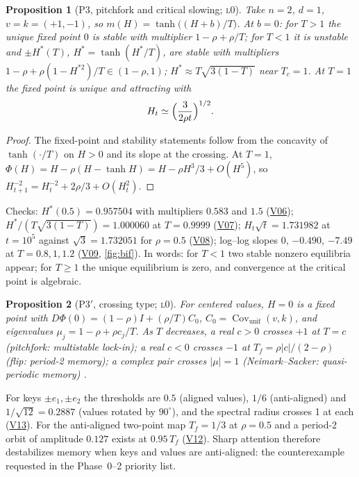 \documentclass[11pt]{article}
\newtheorem{proposition}{Proposition}
\theoremstyle{definition}
\theoremstyle{remark}
\newcommand{\Cov}{\operatorname{Cov}}
\newcommand{\lvl}[1]{\textsc{l}#1}
\newcommand{\V}[1]{\hyperref[app:verify]{\textsf{#1}}}
\begin{document}
\begin{proposition}[P3, pitchfork and critical slowing; \lvl{0}]\label{prop:P3}
Take $n=2$, $d=1$, $v=k=(+1,-1)$, so $m(H)=\tanh\bigl((H+b)/T\bigr)$. At $b=0$: for $T>1$ the unique fixed point $0$ is stable with multiplier $1-\rho+\rho/T$; for $T<1$ it is unstable and $\pm H^*(T)$, $H^*=\tanh(H^*/T)$, are stable with multipliers $1-\rho+\rho(1-H^{*2})/T\in(1-\rho,1)$; $H^*\approx T\sqrt{3(1-T)}$ near $T_c=1$. At $T=1$ the fixed point is unique and attracting with
\[
H_t\simeq\Bigl(\frac{3}{2\rho t}\Bigr)^{1/2}.
\]
\end{proposition}
\begin{proof}
The fixed-point and stability statements follow from the concavity of $\tanh(\cdot/T)$ on $H>0$ and its slope at the crossing. At $T=1$, $\Phi(H)=H-\rho(H-\tanh H)=H-\rho H^3/3+O(H^5)$, so $H_{t+1}^{-2}=H_t^{-2}+2\rho/3+O(H_t^2)$.
\end{proof}
Checks: $H^*(0.5)=0.957504$ with multipliers $0.583$ and $1.5$ (\V{V06}); $H^*/(T\sqrt{3(1-T)})=1.000060$ at $T=0.9999$ (\V{V07}); $H_t\sqrt t=1.731982$ at $t=10^5$ against $\sqrt3=1.732051$ for $\rho=0.5$ (\V{V08}); log--log slopes $0$, $-0.490$, $-7.49$ at $T=0.8,1,1.2$ (\V{V09}, \cref{fig:bif}). In words: for $T<1$ two stable nonzero equilibria appear; for $T\ge1$ the unique equilibrium is zero, and convergence at the critical point is algebraic.

\begin{proposition}[P3$'$, crossing type; \lvl{0}]\label{prop:P3prime}
For centered values, $H=0$ is a fixed point with $D\Phi(0)=(1-\rho)I+(\rho/T)C_0$, $C_0=\Cov_{\mathrm{unif}}(v,k)$, and eigenvalues $\mu_j=1-\rho+\rho c_j/T$. As $T$ decreases, a real $c>0$ crosses $+1$ at $T=c$ (pitchfork: multistable lock-in); a real $c<0$ crosses $-1$ at $T_f=\rho\lvert c\rvert/(2-\rho)$ (flip: period-2 memory); a complex pair crosses $\lvert\mu\rvert=1$ (Neimark--Sacker: quasi-periodic memory) \cite{Kuznetsov2004}.
\end{proposition}
For keys $\pm e_1,\pm e_2$ the thresholds are $0.5$ (aligned values), $1/6$ (anti-aligned) and $1/\sqrt{12}=0.2887$ (values rotated by $90^\circ$), and the spectral radius crosses 1 at each (\V{V13}). For the anti-aligned two-point map $T_f=1/3$ at $\rho=0.5$ and a period-2 orbit of amplitude $0.127$ exists at $0.95\,T_f$ (\V{V12}). Sharp attention therefore destabilizes memory when keys and values are anti-aligned: the counterexample requested in the Phase~0--2 priority list.
\end{document}
